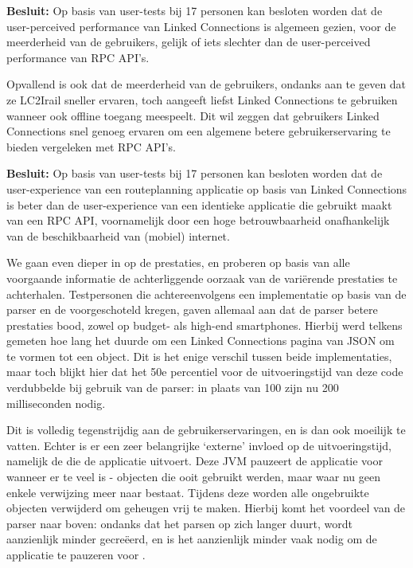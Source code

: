 \textbf{Besluit:} Op basis van user-tests bij 17 personen kan besloten worden dat de user-perceived performance van Linked Connections is algemeen gezien, voor de meerderheid van de gebruikers, gelijk of iets slechter dan de user-perceived performance van RPC API's.

Opvallend is ook dat de meerderheid van de gebruikers, ondanks aan te geven dat ze LC2Irail sneller ervaren, toch aangeeft liefst Linked Connections te gebruiken wanneer ook offline toegang meespeelt. Dit wil zeggen dat gebruikers Linked Connections snel genoeg ervaren om een algemene betere gebruikerservaring te bieden vergeleken met RPC API's.

\textbf{Besluit:} Op basis van user-tests bij 17 personen kan besloten worden dat de user-experience van een routeplanning applicatie op basis van Linked Connections is beter dan de user-experience van een identieke applicatie die gebruikt maakt van een RPC API, voornamelijk door een hoge betrouwbaarheid onafhankelijk van de beschikbaarheid van (mobiel) internet.

We gaan even dieper in op de prestaties, en proberen op basis van alle voorgaande informatie de achterliggende oorzaak van de variërende prestaties te achterhalen. Testpersonen die achtereenvolgens een implementatie op basis van de  parser en de  voorgeschoteld kregen, gaven allemaal aan dat de  parser betere prestaties bood, zowel op budget- als high-end smartphones. Hierbij werd telkens gemeten hoe lang het duurde om een Linked Connections pagina van JSON om te vormen tot een object. Dit is het enige verschil tussen beide implementaties, maar toch blijkt hier dat het 50e percentiel voor de uitvoeringstijd van deze code verdubbelde bij gebruik van de  parser: in plaats van 100 zijn nu 200 milliseconden nodig.

Dit is volledig tegenstrijdig aan de gebruikerservaringen, en is dan ook moeilijk te vatten. Echter is er een zeer belangrijke `externe' invloed op de uitvoeringstijd, namelijk de  die de applicatie uitvoert. Deze JVM pauzeert de applicatie voor  wanneer er te veel  is - objecten die ooit gebruikt werden, maar waar nu geen enkele verwijzing meer naar bestaat. Tijdens deze  worden alle ongebruikte objecten verwijderd om geheugen vrij te maken. Hierbij komt het voordeel van de  parser naar boven: ondanks dat het parsen op zich langer duurt, wordt aanzienlijk minder  gecreëerd, en is het aanzienlijk minder vaak nodig om de applicatie te pauzeren voor .

